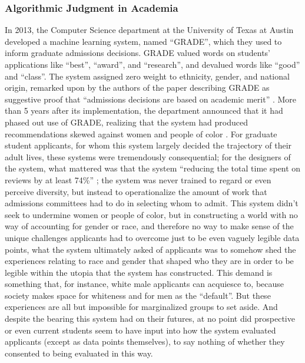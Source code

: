 \documentclass[manuscript,screen]{acmart}
\begin{document}
\subsubsection{Algorithmic Judgment in Academia}
In 2013, the Computer Science department at the University of Texas at Austin developed a machine learning system, named ``GRADE'', which they used to inform graduate admissions decisions.
GRADE valued words on students' applications like ``best'', ``award'', and ``research'', and devalued words like ``good'' and ``class''.
The system assigned zero weight to ethnicity, gender, and national origin, remarked upon by the authors of the paper describing GRADE as suggestive proof that ``admissions decisions are based on academic merit''
\cite{waters2014grade}.
More than 5 years after its implementation, the department announced that it had phased out use of GRADE, realizing that the system had produced recommendations skewed against women and people of color
\cite{UTCSBias}.
For graduate student applicants, for whom this system largely decided the trajectory of their adult lives, these systems were tremendously consequential;
for the designers of the system, what mattered was that the system
``reducing the total time spent on reviews by at least 74\%''
\cite{waters2014grade};
the system was never trained to regard or even perceive diversity, but instead to operationalize the amount of work that admissions committees had to do in selecting whom to admit.
This system didn't seek to undermine women or people of color, but in constructing a world with no way of accounting for gender or race, and therefore no way to make sense of the unique challenges applicants had to overcome just to be even vaguely legible data points, what the system ultimately asked of applicants was to somehow shed the experiences relating to race and gender that shaped who they are in order to be legible within the utopia that the system has constructed.
This demand is something that, for instance, white male applicants can acquiesce to, because society makes space for whiteness and for men as the ``default''.
But these experiences are all but impossible for marginalized groups to set aside.
And despite the bearing this system had on their futures, at no point did prospective or even current students seem to have input into how the system evaluated applicants (except as data points themselves), to say nothing of whether they consented to being evaluated in this way.
\end{document}

